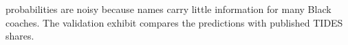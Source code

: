 \begin{table}[!h]
{\begin{threeparttable}
\begin{tablenotes}[para]
probabilities are noisy because names carry little information for many Black coaches. The validation exhibit compares the predictions with published TIDES shares.
\end{tablenotes}
\end{threeparttable}}
\end{table}
